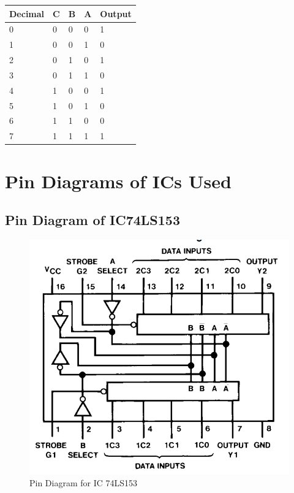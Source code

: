 \documentclass[11pt]{article}
\begin{document}
\begin{table}[H]
	\begin{tabular}{|l|l|l|l|l|}
		\hline
		\textbf{Decimal} & \textbf{C} & \textbf{B} & \textbf{A} & \textbf{Output} \\ \hline
		0                & 0          & 0          & 0          & 1               \\ \hline
		1                & 0          & 0          & 1          & 0               \\ \hline
		2                & 0          & 1          & 0          & 1               \\ \hline
		3                & 0          & 1          & 1          & 0               \\ \hline
		4                & 1          & 0          & 0          & 1               \\ \hline
		5                & 1          & 0          & 1          & 0               \\ \hline
		6                & 1          & 1          & 0          & 0               \\ \hline
		7                & 1          & 1          & 1          & 1               \\ \hline
	\end{tabular}
\end{table}

\section{Pin Diagrams of ICs Used}

\subsection{Pin Diagram of IC74LS153}
\begin{figure}[H]
	\centering
	\includegraphics[scale = 0.5]{pin_diagram_74153.png}
	\caption{Pin Diagram for IC 74LS153}
\end{figure}
\end{document}
